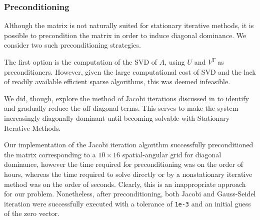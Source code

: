 \documentclass[10pt]{article}
\begin{document}
\begin{multicols}{2}
% 

\subsubsection{Preconditioning}

Although the matrix is not naturally suited for stationary iterative methods, it is possible to precondition the matrix in order to induce diagonal dominance.
We consider two such preconditioning strategies.

The first option is the computation of the SVD of $A$, using $U$ and $V^T$ as preconditioners.
However, given the large computational cost of SVD and the lack of readily available efficient sparse algorithms, this was deemed infeasible.

We did, though, explore the method of Jacobi iterations discussed in \citet{yuan_method_2006} to identify and gradually reduce the off-diagonal terms.
This serves to make the system increasingly diagonally dominant until becoming solvable with Stationary Iterative Methods.
 
Our implementation of the Jacobi iteration algorithm successfully preconditioned the matrix corresponding to a $10\times 16$ spatial-angular grid for diagonal dominance, however the time required for preconditioning was on the order of hours, whereas the time required to solve directly or by a nonstationary iterative method was on the order of seconds.
Clearly, this is an inappropriate approach for our problem.
Nonetheless, after preconditioning, both Jacobi and Gauss-Seidel iteration were successfully executed with a tolerance of \texttt{1e-3} and an initial guess of the zero vector.


\end{multicols}
\end{document}
